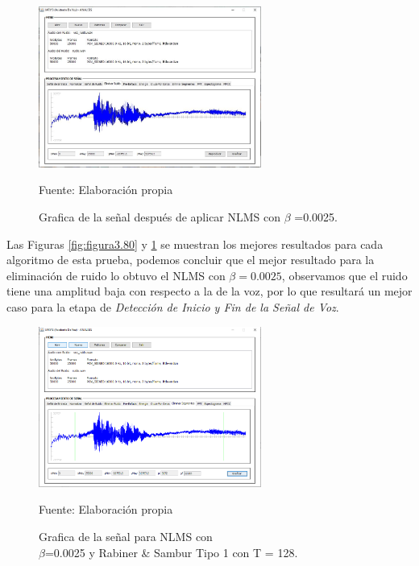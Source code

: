\begin{figure}[H]
\begin{center}
\includegraphics[width=0.65\textwidth]{Imagenes/Cap3/image083}
\end{center}
\begin{center}
\vskip -0.5cm
\caption{\small{Grafica de la señal después de aplicar NLMS con $\beta$ =0.0025.}}
\label{fig:figura3.83}
{\small{Fuente: Elaboración propia}}
\end{center}
\end{figure}

Las Figuras \ref{fig:figura3.80} y \ref{fig:figura3.83} se muestran los mejores resultados para cada algoritmo de esta prueba, podemos concluir que el mejor resultado para la eliminación de ruido lo obtuvo el NLMS con $\beta = 0.0025$, observamos que el ruido tiene una amplitud baja con respecto a la de la voz, por lo que resultará un mejor caso para la etapa de \textit{Detección de Inicio y Fin de la Señal de Voz}.

\begin{figure}[H]
\captionsetup{justification=centering}
\begin{center}
\includegraphics[width=0.65\textwidth]{Imagenes/Cap3/image084}
\end{center}
\begin{center}
\vskip -0.5cm
\caption{\small{Grafica de la señal para NLMS con \\ $\beta$=0.0025 y Rabiner \& Sambur Tipo 1 con T = 128.}}
\label{fig:figura3.84}
{\small{Fuente: Elaboración propia}}
\end{center}
\end{figure}

